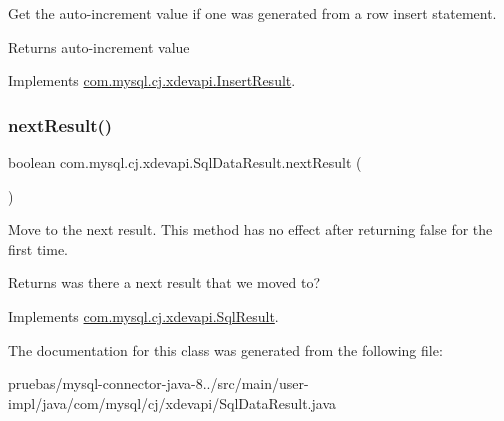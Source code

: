 Get the auto-\/increment value if one was generated from a row insert statement.

\begin{DoxyReturn}{Returns}
auto-\/increment value 
\end{DoxyReturn}


Implements \mbox{\hyperlink{interfacecom_1_1mysql_1_1cj_1_1xdevapi_1_1_insert_result_a32144e23568f91aa21dab0b01cb6b14e}{com.\+mysql.\+cj.\+xdevapi.\+Insert\+Result}}.

\mbox{\label{classcom_1_1mysql_1_1cj_1_1xdevapi_1_1_sql_data_result_a4dc2d012228a58a9ebe74f93f9a007a9}} 
\subsubsection{\texorpdfstring{next\+Result()}{nextResult()}}
{\footnotesize\ttfamily boolean com.\+mysql.\+cj.\+xdevapi.\+Sql\+Data\+Result.\+next\+Result (\begin{DoxyParamCaption}{ }\end{DoxyParamCaption})}

Move to the next result. This method has no effect after returning {\ttfamily false} for the first time.

\begin{DoxyReturn}{Returns}
was there a next result that we moved to? 
\end{DoxyReturn}


Implements \mbox{\hyperlink{interfacecom_1_1mysql_1_1cj_1_1xdevapi_1_1_sql_result_ad5c821bd2efe2e952aef48dc574e913d}{com.\+mysql.\+cj.\+xdevapi.\+Sql\+Result}}.



The documentation for this class was generated from the following file\+:\begin{DoxyCompactItemize}
\item 
pruebas/mysql-\/connector-\/java-\/8../src/main/user-\/impl/java/com/mysql/cj/xdevapi/Sql\+Data\+Result.\+java\end{DoxyCompactItemize}
